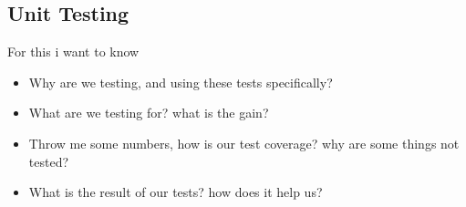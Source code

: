 \subsection{Unit Testing}
For this i want to know
\begin{itemize}
    \item Why are we testing, and using these tests specifically?
    \item What are we testing for? what is the gain?
    \item Throw me some numbers, how is our test coverage? why are some things not tested?
    \item What is the result of our tests? how does it help us?
\end{itemize}
